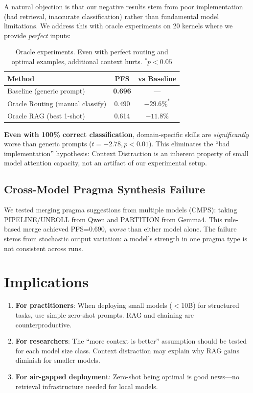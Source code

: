 \documentclass[11pt]{article}
\begin{document}
A natural objection is that our negative results stem from poor
implementation (bad retrieval, inaccurate classification) rather than
fundamental model limitations. We address this with oracle experiments
on 20 kernels where we provide \emph{perfect} inputs:

\begin{table}[t]
\centering
\caption{Oracle experiments. Even with perfect routing and optimal
examples, additional context hurts. $^*p < 0.05$}
\label{tab:oracle}
\begin{tabular}{lcc}
\toprule
\textbf{Method} & \textbf{PFS} & \textbf{vs Baseline} \\
\midrule
Baseline (generic prompt)        & \textbf{0.696} & --- \\
Oracle Routing (manual classify) & 0.490          & $-29.6\%^*$ \\
Oracle RAG (best 1-shot)         & 0.614          & $-11.8\%$ \\
\bottomrule
\end{tabular}
\end{table}

\textbf{Even with 100\% correct classification}, domain-specific skills
are \emph{significantly} worse than generic prompts ($t=-2.78, p<0.01$).
This eliminates the ``bad implementation'' hypothesis: Context Distraction
is an inherent property of small model attention capacity, not an artifact
of our experimental setup.

\subsection{Cross-Model Pragma Synthesis Failure}

We tested merging pragma suggestions from multiple models
(CMPS): taking PIPELINE/UNROLL from Qwen and PARTITION from Gemma4.
This rule-based merge achieved PFS=0.690, \emph{worse} than either
model alone. The failure stems from stochastic output variation:
a model's strength in one pragma type is not consistent across runs.

\section{Implications}

\begin{enumerate}
    \item \textbf{For practitioners}: When deploying small models
    ($<$10B) for structured tasks, use simple zero-shot prompts.
    RAG and chaining are counterproductive.
    \item \textbf{For researchers}: The ``more context is better''
    assumption should be tested for each model size class. Context
    distraction may explain why RAG gains diminish for smaller models.
    \item \textbf{For air-gapped deployment}: Zero-shot being optimal
    is good news---no retrieval infrastructure needed for local models.
\end{enumerate}
\end{document}
